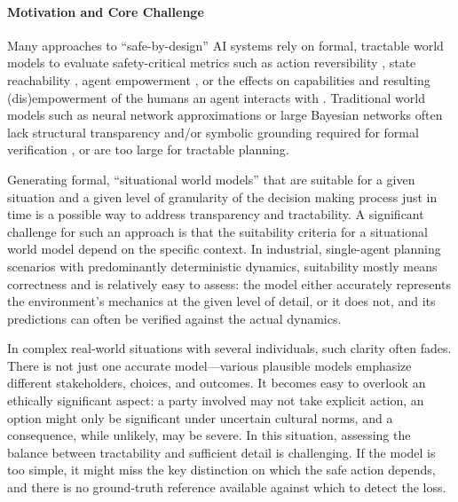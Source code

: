 \documentclass{article}
\begin{document}
\paragraph{Motivation and Core Challenge}
Many approaches to ``safe-by-design'' AI systems \citep{dalrymple2024guaranteedsafeaiframework} rely on formal, tractable world models to evaluate safety-critical metrics such as action reversibility \citep{eysenbach2018leave}, state reachability \citep{krakovna2020avoiding}, agent empowerment \citep{klyubin2005empowerment}, or the effects on capabilities and resulting (dis)empowerment of the humans an agent interacts with \citep{salge2017empowerment,heitzigfair}. 
Traditional world models such as neural network approximations or large Bayesian networks \citep{amodei2016concrete,ha2018world} often lack structural transparency and/or symbolic grounding required for formal verification  \citep{konidaris2018from}, or are too large for tractable planning. 

Generating formal, ``situational world models'' that are suitable for a given situation and a given level of granularity of the decision making process just in time is a possible way to address transparency and tractability.
A significant challenge for such an approach is that the suitability criteria for a situational world model depend on the specific context. In industrial, single-agent planning scenarios with predominantly deterministic dynamics, suitability mostly means correctness and is relatively easy to assess: the model either accurately represents the environment's mechanics at the given level of detail, or it does not, and its predictions can often be verified against the actual dynamics.

In complex real-world situations with several individuals, such clarity often fades. There is not just one accurate model---various plausible models emphasize different stakeholders, choices, and outcomes. It becomes easy to overlook an ethically significant aspect: a party involved may not take explicit action, an option might only be significant under uncertain cultural norms, and a consequence, while unlikely, may be severe. In this situation, assessing the balance between tractability and sufficient detail is challenging. If the model is too simple, it might miss the key distinction on which the safe action depends, and there is no ground-truth reference available against which to detect the loss.
\end{document}
